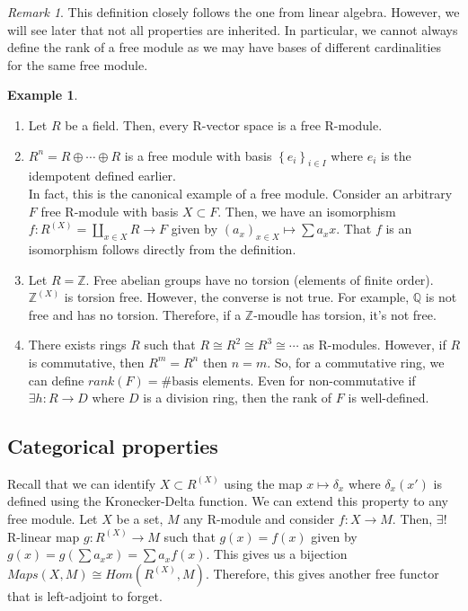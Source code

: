 \documentclass{article}
\newcommand\Z{\ensuremath{\mathbb{Z}}}
\newcommand\Q{\ensuremath{\mathbb{Q}}}
\theoremstyle{definition}
\newtheorem{eg}{Example}[subsection]
\theoremstyle{remark}
\newtheorem*{remark}{Remark}
\theoremstyle{plain}
\begin{document}
\begin{remark}
    This definition closely follows the one from linear algebra. However, we will see later that not
    all properties are inherited. In particular, we cannot always define the rank of a free module as we may have bases of
    different cardinalities for the same free module. 
\end{remark}

\begin{eg}
    \begin{enumerate}
        \item Let \(R\) be a field. Then, every R-vector space is a free R-module. 
        \item \(R^n = R\oplus \cdots \oplus R\) is a free module with basis \(\left\{ e_i \right\}_{i \in I}\) where 
        \(e_i\) is the idempotent defined earlier.\\
        In fact, this is the canonical example of a free module. Consider an arbitrary \(F\) free R-module with basis \(X \subset F\).
        Then, we have an isomorphism \(f: R^{(X)} = \coprod\limits_{x \in X}R \to F\) given by \((a_x)_{x \in X} \mapsto \sum a_xx\). That
        \(f\) is an isomorphism follows directly from the definition. 
        \item Let \(R = \Z\). Free abelian groups have no torsion (elements of finite order).
        \(\Z^{(X)}\) is torsion free. However, the converse is not true. For example, \(\Q\) is not free and has no torsion. 
        Therefore, if a \(\Z\)-moudle has torsion, it's not free.
        \item There exists rings \(R\) such that \(R \cong R^2 \cong R^3 \cong \cdots\) as R-modules. However, if \(R\) is commutative, 
        then \(R^m = R^n\) then \(n = m\). So, for a commutative ring, we can define \(rank(F) = \# \text{basis elements}\). Even for non-commutative
        if \(\exists h: R \to D\) where \(D\) is a division ring, then the rank of \(F\) is well-defined. 
    \end{enumerate}
\end{eg}

\subsection{Categorical properties}

Recall that we can identify \(X \subset R^{(X)}\) using the map \(x \mapsto \delta_x\) where \(\delta_x(x')\) is defined using the Kronecker-Delta function. 
We can extend this property to any free module. Let \(X\) be a set, \(M\) any R-module and consider \(f: X \to M\). Then, \(\exists!\) R-linear map \(g: R^{(X)} \to M \) 
such that \(g(x) = f(x)\) given by \(g(x) = g(\sum a_xx) = \sum a_xf(x)\). This gives us a bijection \(Maps(X,M) \cong Hom(R^{(X)}, M)\). Therefore, this gives another free functor
that is left-adjoint to forget. 
\end{document}

